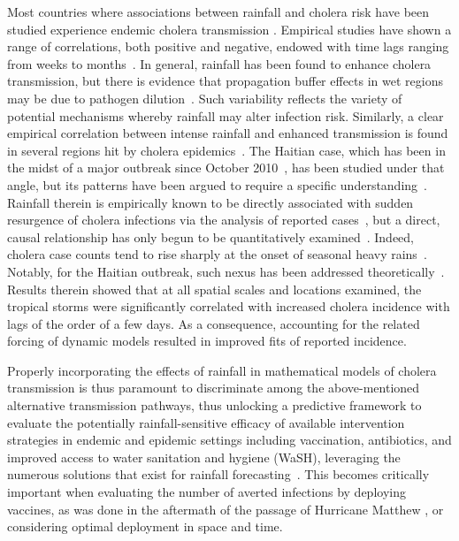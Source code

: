 Most countries where associations between rainfall and cholera risk have been studied experience endemic cholera transmission \cite{rinaldo17}. Empirical studies have shown a range of correlations, both positive and negative, endowed with time lags ranging from weeks to months~\cite{ruiz07,emch08,demagny12}. In general, rainfall has been found to enhance cholera transmission, but there is evidence that propagation buffer effects in wet regions may be due to pathogen dilution~\cite{ruiz07}. Such variability reflects the variety of potential mechanisms whereby rainfall may alter infection risk. Similarly, a clear empirical correlation between intense rainfall and enhanced transmission is found in several regions hit by cholera epidemics~\cite{demagny2008,rebaudet13a,rebaudet13b,jutla13a,gaudart13}. The Haitian case, which has been in the midst of a major outbreak since October 2010~\cite{frerichs12,gaudart13,kirpich2015,european2016,camacho16a,pasettoRealtimeProjectionsCholera2017,khan17}, has been studied under that angle, but its patterns have been argued to require a specific understanding~\cite{piarroux11}. Rainfall therein is empirically known to be directly associated with sudden resurgence of cholera infections via the analysis of reported cases~\cite{gaudart13}, but a direct, causal relationship has only begun to be quantitatively examined~\cite{Rinaldo:Reassessment20102011:2012,eisenbergExaminingRainfallCholera2013,bertuzzoProbabilityExtinctionHaiti2016}. Indeed, cholera case counts tend to rise sharply at the onset of seasonal heavy rains~\cite{adams12,periago12,adams13}. Notably, for the Haitian outbreak, such nexus has been addressed theoretically~\cite{Rinaldo:Reassessment20102011:2012,eisenbergExaminingRainfallCholera2013}. Results therein showed that at all spatial scales and locations examined, the tropical storms were significantly correlated with increased cholera incidence with lags of the order of a few days. As a consequence, accounting for the related forcing of dynamic models resulted in improved fits of reported incidence. 

Properly incorporating the effects of rainfall in mathematical models of cholera transmission is thus paramount to discriminate among the above-mentioned alternative transmission pathways, thus unlocking a predictive framework to evaluate the potentially rainfall-sensitive efficacy of available intervention strategies in endemic and epidemic settings including vaccination, antibiotics, and improved access to water sanitation and hygiene (WaSH), leveraging the numerous solutions that exist for rainfall forecasting~\cite{Rinaldo:Reassessment20102011:2012,bertuzzoProbabilityExtinctionHaiti2016}. This becomes  critically important when evaluating the number of averted infections by deploying vaccines, as was done in the aftermath of the passage of Hurricane Matthew \cite{pasettoRealtimeProjectionsCholera2017}, or considering optimal deployment in space and time.

